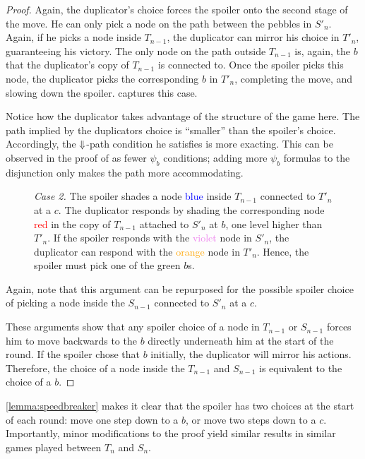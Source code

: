 \documentclass[a4paper,UKenglish,cleveref, autoref, thm-restate, numberwithinsect]{lipics-v2021}
\def\Darrow{\ensuremath\mathord{\Downarrow}}
\begin{document}
\begin{proof}
    Again, the duplicator's choice forces the spoiler onto the second stage of the move. He can only pick a node on the path between the pebbles in $S'_n$. Again, if he picks a node inside $T_{n - 1}$, the duplicator can mirror his choice in $T'_n$, guaranteeing his victory. The only node on the path outside $T_{n - 1}$ is, again, the $b$ that the duplicator's copy of $T_{n - 1}$ is connected to. Once the spoiler picks this node, the duplicator picks the corresponding $b$ in $T'_n$, completing the move, and slowing down the spoiler.  captures this case.

    Notice how the duplicator takes advantage of the structure of the game here. The path implied by the duplicators choice is ``smaller'' than the spoiler's choice. Accordingly, the $\Darrow$-path condition he satisfies is more exacting. This can be observed in the proof of  as fewer $\psi_b$ conditions; adding more $\psi_b$ formulas to the disjunction only makes the path more accommodating.
    \begin{figure}[h]
        \centering
        \caption{\emph{Case 2.} The spoiler shades a node \textcolor{blue}{blue} inside $T_{n - 1}$ connected to $T'_n$ at a $c$. The duplicator responds by shading the corresponding node \textcolor{red}{red} in the copy of $T_{n - 1}$ attached to $S'_n$ at $b$, one level higher than $T'_n$. If the spoiler responds with the \textcolor{violet}{violet} node in $S'_{n}$, the duplicator can respond with the \textcolor{orange}{orange} node in $T'_{n}$. Hence, the spoiler must pick one of the \textcolor{OliveGreen}{green} $b$s.}
        \label{proofstep2fig}
    \end{figure}

    Again, note that this argument can be repurposed for the possible spoiler choice of picking a node inside the $S_{n - 1}$ connected to $S'_n$ at a $c$.\lipicsEnd

    These arguments show that any spoiler choice of a node in $T_{n - 1}$ or $S_{n - 1}$ forces him to move backwards to the $b$ directly underneath him at the start of the round. If the spoiler chose that $b$ initially, the duplicator will mirror his actions. Therefore, the choice of a node inside the $T_{n-1}$ and $S_{n - 1}$ is equivalent to the choice of a $b$.
\end{proof}
\cref{lemma:speedbreaker} makes it clear that the spoiler has two choices at the start of each round: move one step down to a $b$, or move two steps down to a $c$. Importantly, minor modifications to the proof yield similar results in similar games played between $T_n$ and $S_n$.
\end{document}
